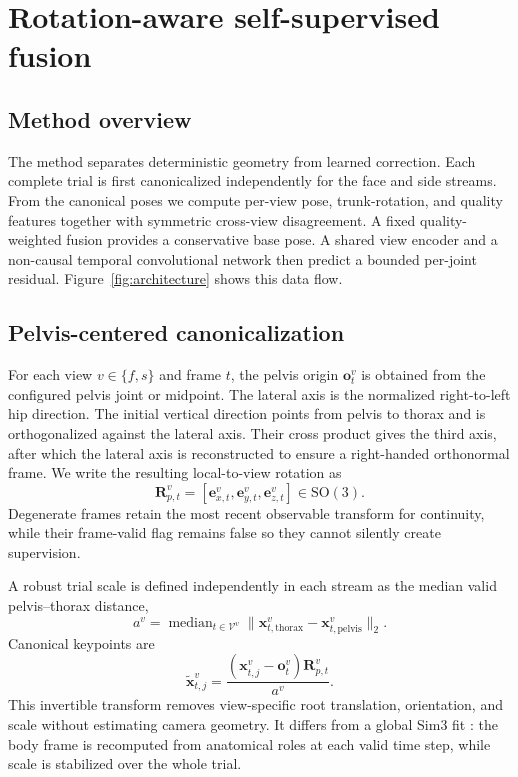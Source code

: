 \section{Rotation-aware self-supervised fusion}
\label{sec:method}

\subsection{Method overview}

The method separates deterministic geometry from learned correction. Each
complete trial is first canonicalized independently for the face and side
streams. From the canonical poses we compute per-view pose, trunk-rotation, and
quality features together with symmetric cross-view disagreement. A fixed
quality-weighted fusion provides a conservative base pose. A shared view
encoder and a non-causal temporal convolutional network then predict a bounded
per-joint residual. Figure~\ref{fig:architecture} shows this data flow.



\subsection{Pelvis-centered canonicalization}

For each view $v\in\{f,s\}$ and frame $t$, the pelvis origin
$\mathbf{o}^{v}_{t}$ is obtained from the configured pelvis joint or midpoint.
The lateral axis is the normalized right-to-left hip direction. The initial
vertical direction points from pelvis to thorax and is orthogonalized against
the lateral axis. Their cross product gives the third axis, after which the
lateral axis is reconstructed to ensure a right-handed orthonormal frame. We
write the resulting local-to-view rotation as
\begin{equation}
  \mathbf{R}^{v}_{p,t}=
  [\mathbf{e}^{v}_{x,t},\mathbf{e}^{v}_{y,t},\mathbf{e}^{v}_{z,t}]
  \in\mathrm{SO}(3).
\end{equation}
Degenerate frames retain the most recent observable transform for continuity,
while their frame-valid flag remains false so they cannot silently create
supervision.

A robust trial scale is defined independently in each stream as the median
valid pelvis--thorax distance,
\begin{equation}
  a^v=\operatorname{median}_{t\in\mathcal{V}^{v}}
  \lVert\mathbf{x}^{v}_{t,\mathrm{thorax}}-
  \mathbf{x}^{v}_{t,\mathrm{pelvis}}\rVert_2.
\end{equation}
Canonical keypoints are
\begin{equation}
  \widetilde{\mathbf{x}}^{v}_{t,j}=
  \frac{(\mathbf{x}^{v}_{t,j}-\mathbf{o}^{v}_{t})
  \mathbf{R}^{v}_{p,t}}{a^v}.
  \label{eq:canonical}
\end{equation}
This invertible transform removes view-specific root translation, orientation,
and scale without estimating camera geometry. It differs from a global Sim3 fit
\citep{Umeyama1991Similarity}: the body frame is recomputed from anatomical
roles at each valid time step, while scale is stabilized over the whole trial.

